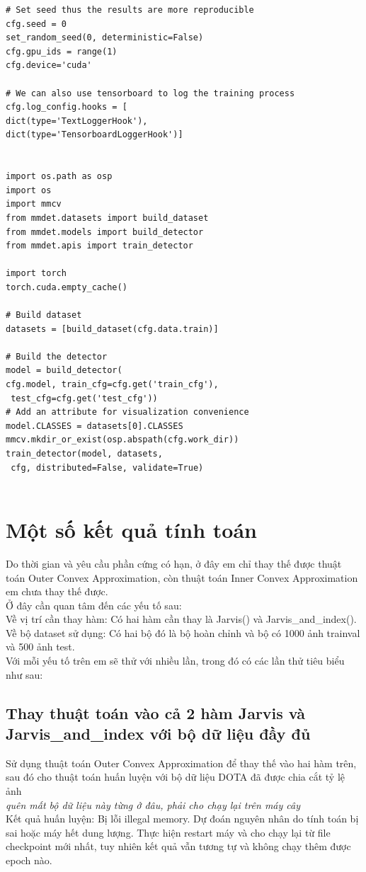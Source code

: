 \documentclass[12pt,a4paper,openany,oneside]{report}
\begin{document}
\begin{lstlisting}
# Set seed thus the results are more reproducible
cfg.seed = 0
set_random_seed(0, deterministic=False)
cfg.gpu_ids = range(1)
cfg.device='cuda'

# We can also use tensorboard to log the training process
cfg.log_config.hooks = [
dict(type='TextLoggerHook'),
dict(type='TensorboardLoggerHook')]


import os.path as osp
import os
import mmcv
from mmdet.datasets import build_dataset
from mmdet.models import build_detector
from mmdet.apis import train_detector

import torch
torch.cuda.empty_cache()

# Build dataset
datasets = [build_dataset(cfg.data.train)]

# Build the detector
model = build_detector(
cfg.model, train_cfg=cfg.get('train_cfg'),
 test_cfg=cfg.get('test_cfg'))
# Add an attribute for visualization convenience
model.CLASSES = datasets[0].CLASSES
mmcv.mkdir_or_exist(osp.abspath(cfg.work_dir))
train_detector(model, datasets,
 cfg, distributed=False, validate=True)


\end{lstlisting}

\chapter{Một số kết quả tính toán }
Do thời gian và yêu cầu phần cứng có hạn, ở đây em chỉ thay thế được thuật toán Outer Convex Approximation, còn thuật toán Inner Convex Approximation em chưa thay thế được.\\
Ở đây cần quan tâm đến các yếu tố sau:\\
Về vị trí cần thay hàm: Có hai hàm cần thay là Jarvis() và Jarvis\_and\_index().\\
Về bộ dataset sử dụng: Có hai bộ đó là bộ hoàn chỉnh và bộ có 1000 ảnh trainval và 500 ảnh test.\\
Với mỗi yếu tố trên em sẽ thử với nhiều lần, trong đó có các lần thử tiêu biểu như sau:
\section{Thay thuật toán vào cả 2 hàm Jarvis và\\
	 Jarvis\_and\_index với bộ dữ liệu đầy đủ}
Sử dụng thuật toán Outer Convex Approximation để thay thế vào hai hàm trên, sau đó cho thuật toán huấn luyện với bộ dữ liệu DOTA đã được chia cắt tỷ lệ ảnh\\
\textit{quên mất bộ dữ liệu này từng ở đâu, phải cho chạy lại trên máy cây}\\
Kết quả huấn luyện: Bị lỗi illegal memory. Dự đoán nguyên nhân do tính toán bị sai hoặc máy hết dung lượng. Thực hiện restart máy và cho chạy lại từ file checkpoint mới nhất, tuy nhiên kết quả vẫn tương tự và không chạy thêm được epoch nào.
\end{document}
